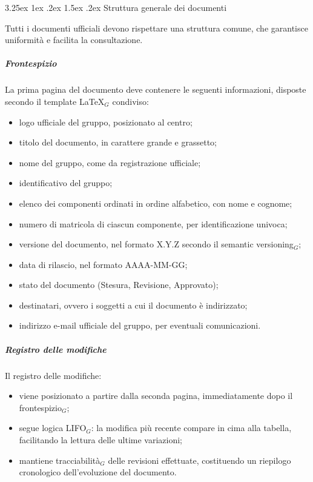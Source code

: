 \documentclass[a4paper, 10pt]{article}
\makeatletter
\renewcommand\paragraph{\@startsection{paragraph}{4}{\z@}%
  {3.25ex \@plus1ex \@minus .2ex}%
  {1.5ex \@plus .2ex}%
  {\normalfont\normalsize\bfseries}}
\makeatother
\begin{document}
\paragraph{Struttura generale dei documenti}
\label{subsubsec:strutturagenerale}

Tutti i documenti ufficiali devono rispettare una struttura comune, che garantisce uniformità e facilita la consultazione.

\subparagraph{Frontespizio} 

La prima pagina del documento deve contenere le seguenti informazioni, disposte secondo il template \LaTeX$_G$ condiviso:
\begin{itemize}
    \item logo ufficiale del gruppo, posizionato al centro;
    \item titolo del documento, in carattere grande e grassetto;
    \item nome del gruppo, come da registrazione ufficiale;
    \item identificativo del gruppo;
    \item elenco dei componenti ordinati in ordine alfabetico, con nome e cognome;
    \item numero di matricola di ciascun componente, per identificazione univoca;
    \item versione del documento, nel formato X.Y.Z secondo il semantic versioning$_G$;
    \item data di rilascio, nel formato AAAA-MM-GG;
    \item stato del documento (Stesura, Revisione, Approvato);
    \item destinatari, ovvero i soggetti a cui il documento è indirizzato;
    \item indirizzo e-mail ufficiale del gruppo, per eventuali comunicazioni.
\end{itemize}

\subparagraph{Registro delle modifiche}

Il registro delle modifiche:
\begin{itemize}
    \item viene posizionato a partire dalla seconda pagina, immediatamente dopo il frontespizio$_G$;
    \item segue logica LIFO$_G$: la modifica più recente compare in cima alla tabella, facilitando la lettura delle ultime variazioni;
    \item mantiene tracciabilità$_G$ delle revisioni effettuate, costituendo un riepilogo cronologico dell'evoluzione del documento.
\end{itemize}
\end{document}

